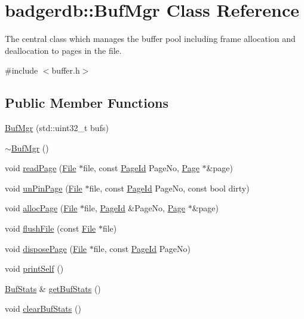 \hypertarget{classbadgerdb_1_1BufMgr}{\section{badgerdb\-:\-:Buf\-Mgr Class Reference}
\label{classbadgerdb_1_1BufMgr}
}


The central class which manages the buffer pool including frame allocation and deallocation to pages in the file.  




{\ttfamily \#include $<$buffer.\-h$>$}

\subsection*{Public Member Functions}
\begin{DoxyCompactItemize}
\item 
\hyperlink{classbadgerdb_1_1BufMgr_a18b7cf23b619c7c0e593d1dc45da77b4}{Buf\-Mgr} (std\-::uint32\-\_\-t bufs)
\item 
\hyperlink{classbadgerdb_1_1BufMgr_aab08001e1be18bfbd4af9113e91cf953}{$\sim$\-Buf\-Mgr} ()
\item 
void \hyperlink{classbadgerdb_1_1BufMgr_a9f853f0f1d4628e7e14374d0c7c6a4f3}{read\-Page} (\hyperlink{classbadgerdb_1_1File}{File} $\ast$file, const \hyperlink{namespacebadgerdb_a1f49e404293bf4240756b89b53b1587a}{Page\-Id} Page\-No, \hyperlink{classbadgerdb_1_1Page}{Page} $\ast$\&page)
\item 
void \hyperlink{classbadgerdb_1_1BufMgr_aa9bdf04c8543f59744db22efa9420c89}{un\-Pin\-Page} (\hyperlink{classbadgerdb_1_1File}{File} $\ast$file, const \hyperlink{namespacebadgerdb_a1f49e404293bf4240756b89b53b1587a}{Page\-Id} Page\-No, const bool dirty)
\item 
void \hyperlink{classbadgerdb_1_1BufMgr_ab9ae3b12aac55b119b5763e3de2a4d2b}{alloc\-Page} (\hyperlink{classbadgerdb_1_1File}{File} $\ast$file, \hyperlink{namespacebadgerdb_a1f49e404293bf4240756b89b53b1587a}{Page\-Id} \&Page\-No, \hyperlink{classbadgerdb_1_1Page}{Page} $\ast$\&page)
\item 
void \hyperlink{classbadgerdb_1_1BufMgr_acc61d1985720411ebb76e70f702827d3}{flush\-File} (const \hyperlink{classbadgerdb_1_1File}{File} $\ast$file)
\item 
void \hyperlink{classbadgerdb_1_1BufMgr_a870a80a0f0abcf3b640b913b46b64486}{dispose\-Page} (\hyperlink{classbadgerdb_1_1File}{File} $\ast$file, const \hyperlink{namespacebadgerdb_a1f49e404293bf4240756b89b53b1587a}{Page\-Id} Page\-No)
\item 
void \hyperlink{classbadgerdb_1_1BufMgr_a598b3112b8193af603f5bc97c478a671}{print\-Self} ()
\item 
\hyperlink{structbadgerdb_1_1BufStats}{Buf\-Stats} \& \hyperlink{classbadgerdb_1_1BufMgr_a93148e1af99f06f4f264d948920b7c1c}{get\-Buf\-Stats} ()
\item 
void \hyperlink{classbadgerdb_1_1BufMgr_a702a264ae946b334414e51700edd81a0}{clear\-Buf\-Stats} ()
\end{DoxyCompactItemize}
